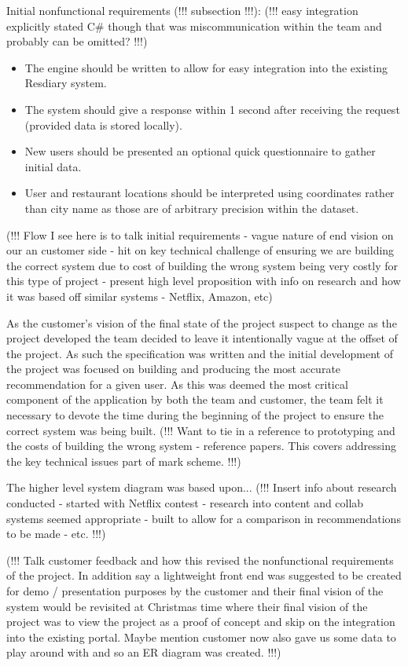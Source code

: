\documentclass{l3proj}
\begin{document}
Initial nonfunctional requirements (!!! subsection !!!):
(!!! easy integration explicitly stated C\# though that was miscommunication within the team and probably can be omitted? !!!)
\begin{itemize}
\item The engine should be written to allow for easy integration into the existing Resdiary system.
\item The system should give a response within 1 second after receiving the request (provided data is stored locally).
\item New users should be presented an optional quick questionnaire to gather initial data.
\item User and restaurant locations should be interpreted using coordinates rather than city  name as those are of arbitrary precision within the dataset.
\end{itemize}

(!!! Flow I see here is to talk initial requirements - vague nature of end vision on our an customer side - hit on key technical challenge of ensuring we are building the correct system due to cost of building the wrong system being very costly for this type of project - present high level proposition with info on research and how it was based off similar systems - Netflix, Amazon, etc) 

As the customer’s vision of the final state of the project suspect to change as the project developed the team decided to leave it intentionally vague at the offset of the project. As such the specification was written and the initial development of the project was focused on building and producing the most accurate recommendation for a given user. As this was deemed the most critical component of the application by both the team and customer, the team felt it necessary to devote the time during the beginning of the project to ensure the correct system was being built. (!!! Want to tie in a reference to prototyping and the costs of building the wrong system - reference papers. This covers addressing the key technical issues part of mark scheme. !!!)

The higher level system diagram was based upon... 
(!!! Insert info about research conducted - started with Netflix contest - research into content and collab systems seemed appropriate - built to allow for a comparison in recommendations to be made - etc. !!!)

(!!! Talk customer feedback and how this revised the nonfunctional requirements of the project. In addition say a lightweight front end was suggested to be created for demo / presentation purposes by the customer and their final vision of the system would be revisited at Christmas time where their final vision of the project was to view the project as a proof of concept and skip on the integration into the existing portal. Maybe mention customer now also gave us some data to play around with and so an ER diagram was created. !!!)
\end{document}
